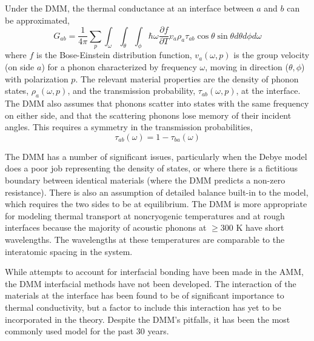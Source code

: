 Under the DMM, the thermal conductance at an interface between $a$ and $b$ can be approximated,  
\begin{equation}
G_{ab} = \frac{1}{4 \pi} \sum_p \int_\omega \int_\theta \int_\phi \hbar \omega \frac{\partial f}{\partial T}  v_a  \rho_a  \tau_{ab} \cos\theta \sin\theta d\theta d\phi d\omega
\end{equation}
where $f$ is the Bose-Einstein distribution function, $v_a(\omega, p)$ is the group velocity (on side $a$) for a phonon characterized by frequency $\omega$, moving in direction ($\theta, \phi$) with polarization $p$.  The relevant material properties are the density of phonon states, $\rho_a(\omega, p)$, and the transmission probability, $\tau_{ab}(\omega, p)$, at the interface.\cite{Swartz:1989uq,Reddy:2005fk,Monachon2016}  The DMM also assumes that phonons scatter into states with the same frequency on either side, and that the scattering phonons lose memory of their incident angles.  This requires a symmetry in the transmission probabilities,
\begin{equation}
\tau_{ab}(\omega) = 1 - \tau_{ba}(\omega)
\end{equation}

The DMM has a number of significant issues, particularly when the Debye model does a poor job representing the density of states, or where there is a fictitious boundary between identical materials (where the DMM predicts a non-zero resistance).\cite{Monachon2016}  There is also an assumption of detailed balance built-in to the model,\cite{Chen2005} which requires the two sides to be at equilibrium.
The DMM is more appropriate for modeling thermal transport at noncryogenic temperatures and at rough interfaces because the majority of acoustic phonons at $\geq$300 K have short wavelengths. The wavelengths at these temperatures are comparable to the interatomic spacing in the system.

While attempts to account for interfacial bonding have been made in the AMM, the DMM interfacial methods have not been developed.
The interaction of the materials at the interface has been found to be of significant importance to thermal conductivity\cite{Beechem2007, Hopkins-surf-rough, Hopkins-inelastic}, but a factor to include this interaction has yet to be incorporated in the theory.
Despite the DMM's pitfalls, it has been the most commonly used model for the past 30 years. \cite{Cahill2006, Stoner1993, Stevens2005, Cahill2011}

